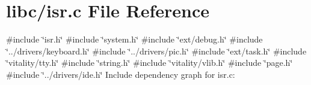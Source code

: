 \hypertarget{a00101}{}\section{libc/isr.c File Reference}
\label{a00101}
{\ttfamily \#include \char`\"{}isr.\+h\char`\"{}}\newline
{\ttfamily \#include \char`\"{}system.\+h\char`\"{}}\newline
{\ttfamily \#include \char`\"{}ext/debug.\+h\char`\"{}}\newline
{\ttfamily \#include \char`\"{}../drivers/keyboard.\+h\char`\"{}}\newline
{\ttfamily \#include \char`\"{}../drivers/pic.\+h\char`\"{}}\newline
{\ttfamily \#include \char`\"{}ext/task.\+h\char`\"{}}\newline
{\ttfamily \#include \char`\"{}vitality/tty.\+h\char`\"{}}\newline
{\ttfamily \#include \char`\"{}string.\+h\char`\"{}}\newline
{\ttfamily \#include \char`\"{}vitality/vlib.\+h\char`\"{}}\newline
{\ttfamily \#include \char`\"{}page.\+h\char`\"{}}\newline
{\ttfamily \#include \char`\"{}../drivers/ide.\+h\char`\"{}}\newline
Include dependency graph for isr.\+c\+:
